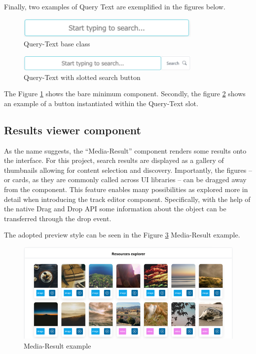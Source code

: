 Finally, two examples of Query Text are exemplified in the figures below.

\begin{figure}[H]
\centering
\includegraphics[width=0.8\textwidth]{images/QueryText.png}
\caption{Query-Text base class}
\label{fig:queryTextBase}
\end{figure}

\begin{figure}[H]
\centering
\includegraphics[width=0.8\textwidth]{images/QueryTextSlotted.png}
\caption{Query-Text with slotted search button}
\label{fig:queryTextSlotted}
\end{figure}

The Figure \ref{fig:queryTextBase} shows the bare minimum component. Secondly, the figure \ref{fig:queryTextSlotted} shows an example of a button instantiated within the Query-Text slot.

\subsection{Results viewer component}
\label{subsec:resultsComponents}

As the name suggests, the “Media-Result” component renders some results onto the interface. For this project, search results are displayed as a gallery of thumbnails allowing for content selection and discovery. Importantly, the figures – or cards, as they are commonly called across UI libraries – can be dragged away from the component. This feature enables many possibilities as explored more in detail when introducing the track editor component. Specifically, with the help of the native Drag and Drop API some information about the object can be transferred through the drop event.

The adopted preview style can be seen in the Figure \ref{fig:mediaResults} Media-Result example.

\begin{figure}[H]
\centering
\includegraphics[width=1\textwidth]{images/ResultsMedia.png}
\caption{Media-Result example}
\label{fig:mediaResults}
\end{figure}

